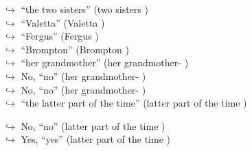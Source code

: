 \documentclass[11pt,a4paper, onecolumn]{article}
\begin{document}
\begin{figure}[t] \small \begin{tcolorbox}[boxsep=0pt,left=5pt,right=0pt,top=2pt,colback = yellow!5] \begin{dialogue}
 \small 
\colorbox{pink!25}{$\hookrightarrow$}
{ ``the two sisters'' (two sisters ) }
\\
\colorbox{pink!25}{$\hookrightarrow$}
{ ``Valetta'' (Valetta ) }
\\
\colorbox{pink!25}{$\hookrightarrow$}
{ ``Fergus'' (Fergus ) }
\\
\colorbox{pink!25}{$\hookrightarrow$}
{ ``Brompton'' (Brompton ) }
\\
\colorbox{pink!25}{$\hookrightarrow$}
{ ``her grandmother'' (her grandmother- ) }
\\
\colorbox{pink!25}{$\hookrightarrow$}
\colorbox{red!25}{No,}
{ ``no'' (her grandmother- ) }
\\
\colorbox{pink!25}{$\hookrightarrow$}
\colorbox{red!25}{No,}
{ ``no'' (her grandmother- ) }
\\
\colorbox{pink!25}{$\hookrightarrow$}
{ ``the latter part of the time'' (latter part of the time ) }
 \end{dialogue}\end{tcolorbox}\end{figure}\begin{figure}[t] \small \begin{tcolorbox}[boxsep=0pt,left=5pt,right=0pt,top=2pt,colback = yellow!5] \begin{dialogue}
 \small 
\colorbox{pink!25}{$\hookrightarrow$}
\colorbox{red!25}{No,}
{ ``no'' (latter part of the time ) }
\\
\colorbox{pink!25}{$\hookrightarrow$}
\colorbox{red!25}{Yes,}
{ ``yes'' (latter part of the time ) }
\\
 \end{dialogue}\end{tcolorbox}\end{figure}
\end{document}
